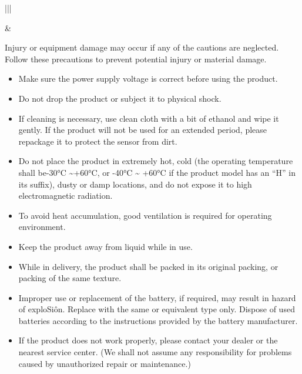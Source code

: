 \documentclass[letterpaper,10pt,openany,oneside,english]{sphinxmanual}
\begin{document}
\begin{savenotes}\sphinxattablestart
\centering
\begin{tabular}[t]{|||}
\hline

\noindent{}
&
\\
\hline
\end{tabular}
\par
\sphinxattableend\end{savenotes}

 Injury or equipment damage may occur if any of the cautions are neglected. Follow these precautions to prevent potential injury or material damage.
\begin{itemize}
\item {} 
Make sure the power supply voltage is correct before using the product.

\item {} 
Do not drop the product or subject it to physical shock.

\item {} 
If cleaning is necessary, use clean cloth with a bit of ethanol and wipe it gently. If the product will not be used for an extended period, please repackage it to protect the sensor from dirt.

\item {} 
Do not place the product in extremely hot, cold (the operating temperature shall be-30°C \textasciitilde{}+60°C, or -40°C \textasciitilde{} +60°C if the product model has an “H” in its suffix), dusty or damp locations, and do not expose it to high electromagnetic radiation.

\item {} 
To avoid heat accumulation, good ventilation is required for operating environment.

\item {} 
Keep the product away from liquid while in use.

\item {} 
While in delivery, the product shall be packed in its original packing, or packing of the same texture.

\item {} 
Improper use or replacement of the battery, if required, may result in hazard of exploSiôn. Replace with the same or equivalent type only. Dispose of used batteries according to the instructions provided by the battery manufacturer.

\item {} 
If the product does not work properly, please contact your dealer or the nearest service center. (We shall not assume any responsibility for problems caused by unauthorized repair or maintenance.)

\end{itemize}
\end{document}
